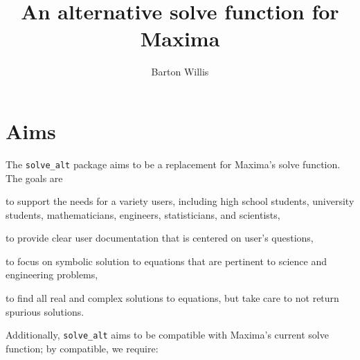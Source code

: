 \documentclass[]{scrartcl}
\title{An alternative solve function for Maxima}
\author{Barton Willis}
\newcommand{\altsolve}{\texttt{solve\_alt}}
\begin{document}
\maketitle

\section{Aims}

The \altsolve\/ package aims to be a replacement for Maxima's solve function. The goals are

\begin{alphalist}[]

\item to support the needs for a variety users, including high school students, university students, mathematicians, engineers, statisticians, and scientists,

\item to provide clear user documentation that is centered  on user's questions,

\item to focus on symbolic solution to equations that are pertinent to science and engineering problems,

\item to find all real and complex solutions to equations, but take care to not return spurious solutions.

\end{alphalist}
Additionally, \altsolve\/  aims to be compatible with Maxima's current solve function; by compatible, we require:
\end{document}
